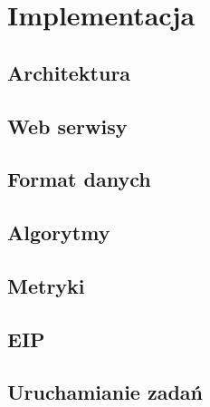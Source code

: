 \chapter{Implementacja}

\section{Architektura}

\section{Web serwisy}

\section{Format danych}

\section{Algorytmy}

\section{Metryki}

\section{EIP}

\section{Uruchamianie zadań}
